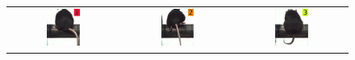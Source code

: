\begin{figure}[!htbp]
\begin{tabular}{ccc}
\centering
\includegraphics[width=0.32\textwidth]{figuras/expertos/videos/1.pdf} & \includegraphics[width=0.32\textwidth]{figuras/expertos/videos/2.pdf} & \includegraphics[width=0.32\textwidth]{figuras/expertos/videos/3.pdf} \\

\end{tabular}
\end{figure}
